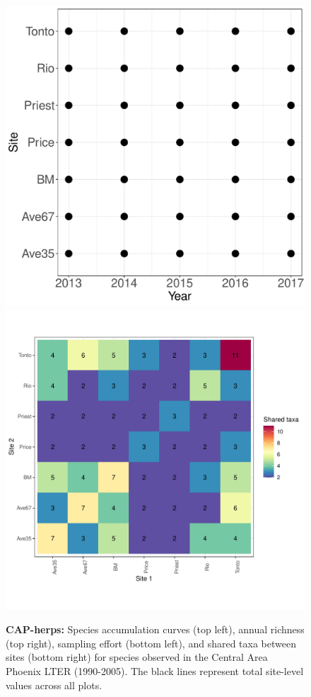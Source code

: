 \documentclass[11pt, oneside]{article}
\begin{document}
\begin{figure}[h!]
\includegraphics[scale = 0.4]{cap-herps-banville_spatiotemporal_sampling_effort.pdf}
\includegraphics[scale = 0.4]{cap-herps-banville_spp_shared.pdf}
\caption{{\bf CAP-herps:} Species accumulation curves (top left),  annual richness (top right), sampling effort (bottom left), and shared taxa between sites (bottom right) for species observed in the Central Area Phoenix LTER (1990-2005). The black lines represent total site-level values across all plots.}
\label{cap-herps}
\end{figure}
\end{document}
